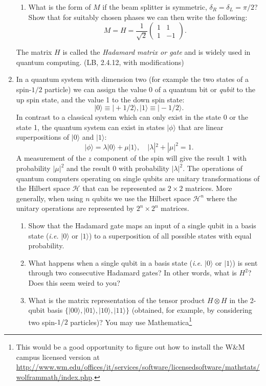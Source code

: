 \documentclass[letterpaper,11pt]{article}
\begin{document}
\begin{enumerate}
\begin{figure}
 \end{figure}
 \begin{enumerate}[resume]
  \item What is the form of $M$ if the beam splitter is symmetric, $\delta_R = \delta_L = \pi/2$? Show that for suitably chosen phases we can then write the following:
  $$ M = H = \frac{1}{\sqrt{2}} \left( \begin{array}{cc} 1 & 1 \\ 1 & -1 \end{array} \right). $$
\end{enumerate}
  The matrix $H$ is called the \textit{Hadamard matrix or gate} and is widely used in quantum computing. (LB, 2.4.12, with modifications)
  \item In a quantum system with dimension two (for example the two states of a spin-$1/2$ particle) we can assign the value 0 of a quantum bit or \textit{qubit} to the up spin state, and the value 1 to the down spin state:
  $$ |0\rangle \equiv |+1/2\rangle, |1\rangle \equiv |-1/2\rangle. $$
  In contrast to a classical system which can only exist in the state 0 or the state 1, the quantum system can exist in states $|\phi\rangle$ that are linear superpositions of $|0\rangle$ and $|1\rangle$:
  $$ |\phi\rangle = \lambda |0\rangle + \mu |1\rangle, \quad |\lambda|^2 + |\mu|^2 = 1. $$
  A measurement of the $z$ component of the spin will give the result 1 with probability $|\mu|^2$ and the result 0 with probability $|\lambda|^2$. The operations of quantum computers operating on single qubits are unitary transformations of the Hilbert space $\mathcal{H}$ that can be represented as $2 \times 2$ matrices. More generally, when using $n$ qubits we use the Hilbert space $\mathcal{H}^n$ where the unitary operations are represented by $2^n \times 2^n$ matrices.
  \begin{enumerate}
    \item Show that the Hadamard gate maps an input of a single qubit in a basis state (\textit{i.e.} $|0\rangle$ or $|1\rangle$) to a superposition of all possible states with equal probability.
    \item What happens when a single qubit in a basis state (\textit{i.e.} $|0\rangle$ or $|1\rangle$) is sent through two consecutive Hadamard gates? In other words, what is $H^2$? Does this seem weird to you?
    \item What is the matrix representation of the tensor product $H \otimes H$ in the 2-qubit basis $\{|00\rangle ,|01\rangle ,|10\rangle ,|11\rangle\}$ (obtained, for example, by considering two spin-$1/2$ particles)? You may use Mathematica\footnote{This would be a good opportunity to figure out how to install the W\&M campus licensed version at \url{http://www.wm.edu/offices/it/services/software/licensedsoftware/mathstats/wolframmath/index.php}.}

\end{enumerate}
\end{enumerate}
\end{document}
